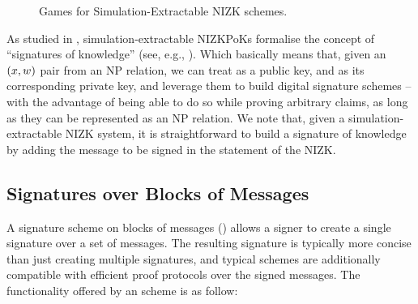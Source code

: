\begin{figure}[ht!]
{\begin{minipage}[t]{0.5\textwidth}
    \end{minipage}
  }
  \label{fig:nizk-games}
  \caption{Games for Simulation-Extractable NIZK schemes.}
\end{figure}

As studied in \cite{cl06}, simulation-extractable NIZKPoKs formalise the concept
of ``signatures of knowledge'' (see, e.g., \cite{cs97}). Which basically means
that, given an $(x,w)$ pair from an NP relation, we can treat \NIZKx
as a public key, and \NIZKw as its corresponding private key, and leverage them
to build digital signature schemes -- with the advantage of being able to do so
while proving arbitrary claims, as long as they can be represented as an NP
relation. We note that, given a simulation-extractable NIZK system, it is
straightforward to build a signature of knowledge by adding the message to be
signed in the statement of the NIZK.

\iffalse
\subsection{Signatures over Blocks of Messages}
\label{sapp:sbm}

A signature scheme on blocks of messages (\SBM) allows a signer to create a
single signature over a set of messages. The resulting signature is typically
more concise than just creating multiple signatures, and typical schemes
\cite{cl02,asm06,ps16} are additionally compatible with efficient proof
protocols over the signed messages. The functionality offered by an \SBM scheme
is as follow:

